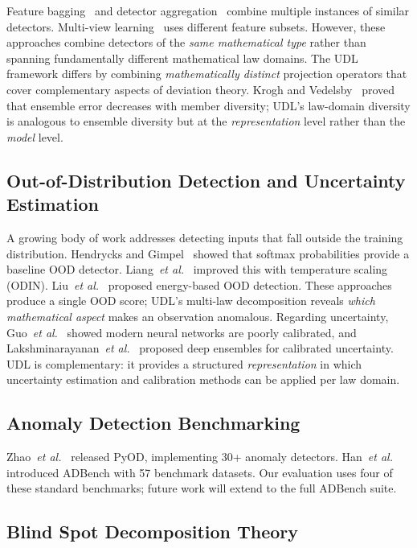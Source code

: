 \documentclass[journal]{IEEEtran}
\newcommand{\etal}{\textit{et al.}}
\begin{document}
Feature bagging~\cite{lazarevic2005feature} and detector aggregation~\cite{aggarwal2015theoretical} combine multiple instances of similar detectors. Multi-view learning~\cite{zhao2015multi} uses different feature subsets. However, these approaches combine detectors of the \textit{same mathematical type} rather than spanning fundamentally different mathematical law domains. The UDL framework differs by combining \textit{mathematically distinct} projection operators that cover complementary aspects of deviation theory. Krogh and Vedelsby~\cite{krogh1995neural} proved that ensemble error decreases with member diversity; UDL's law-domain diversity is analogous to ensemble diversity but at the \textit{representation} level rather than the \textit{model} level.

\subsection{Out-of-Distribution Detection and Uncertainty Estimation}

A growing body of work addresses detecting inputs that fall outside the training distribution. Hendrycks and Gimpel~\cite{hendrycks2017baseline} showed that softmax probabilities provide a baseline OOD detector. Liang~\etal~\cite{liang2018odin} improved this with temperature scaling (ODIN). Liu~\etal~\cite{liu2020energy} proposed energy-based OOD detection. These approaches produce a single OOD score; UDL's multi-law decomposition reveals \textit{which mathematical aspect} makes an observation anomalous. Regarding uncertainty, Guo~\etal~\cite{guo2017calibration} showed modern neural networks are poorly calibrated, and Lakshminarayanan~\etal~\cite{lakshminarayanan2017ensembles} proposed deep ensembles for calibrated uncertainty. UDL is complementary: it provides a structured \textit{representation} in which uncertainty estimation and calibration methods can be applied per law domain.

\subsection{Anomaly Detection Benchmarking}

Zhao~\etal~\cite{zhao2019pyod} released PyOD, implementing 30+ anomaly detectors. Han~\etal~\cite{han2022adbench} introduced ADBench with 57 benchmark datasets. Our evaluation uses four of these standard benchmarks; future work will extend to the full ADBench suite.

\subsection{Blind Spot Decomposition Theory}
\end{document}
